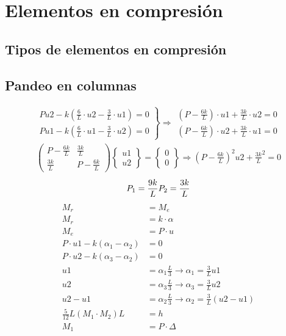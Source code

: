 %
%

\chapter{Elementos en compresión}
\section{Tipos de elementos en compresión}
\section{Pandeo en columnas}
\begin{example}
\begin{align*}
\left.\begin{matrix}
P u2-k\left(\frac{6}{L}\cdot u2-\frac{3}{L}\cdot u1\right)=0\\ P u1-k\left(\frac{6}{L}\cdot u1-\frac{3}{L}\cdot u2\right)=0
\end{matrix}\right\}\Rightarrow \begin{matrix}
(P-\frac{6k}{L})\cdot u1+\frac{3k}{L}\cdot u2=0\\
(P-\frac{6k}{L})\cdot u2+\frac{3k}{L}\cdot u1=0
\end{matrix}\\
\begin{pmatrix}
P-\frac{6k}{L} &\frac{3k}{L} \\ 
 \frac{3k}{L}&P-\frac{6k}{L} 
\end{pmatrix}\begin{Bmatrix}
u1\\u2
\end{Bmatrix}=\begin{Bmatrix}
0\\0
\end{Bmatrix}\Rightarrow (P-\frac{6k}{L})^2 u2+\frac{3k}{L}^2=0
\end{align*}
\[
P_1=\frac{9k}{L}\\
P_2=\frac{3k}{L}\]
\begin{align*}
M_r &= M_e\\
M_r &= k\cdot\alpha\\
M_e &= P\cdot u\\
P\cdot u1-k(\alpha_1-\alpha_2) &= 0\\
P\cdot u2-k(\alpha_3-\alpha_2) &= 0\\
u1 &= \alpha_1\frac{L}{3}\rightarrow \alpha_1 = \frac{3}{L}u1\\
u2 &= \alpha_3\frac{L}{3}\rightarrow \alpha_3 = \frac{3}{L}u2\\
u2-u1 &= \alpha_2\frac{L}{3}\rightarrow \alpha_2 = \frac{3}{L}(u2-u1)\\
\frac{5}{12}L(M_1\cdot M_2)L &= h\\
M_1 &= P\cdot \Delta\\
\end{align*}
\end{example}
